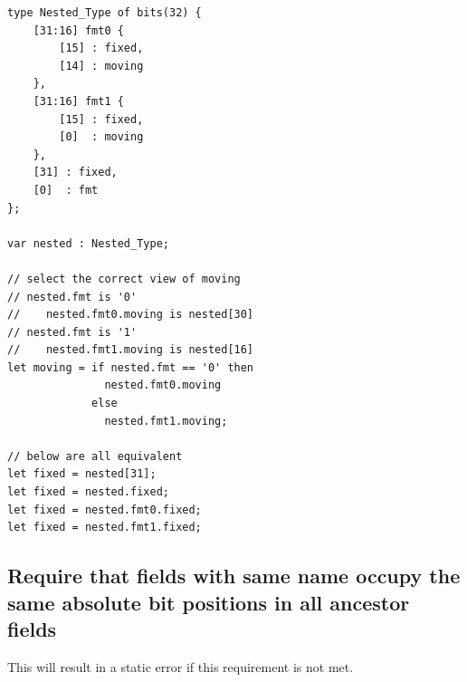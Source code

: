 \begin{verbatim}
type Nested_Type of bits(32) {
    [31:16] fmt0 {
        [15] : fixed,
        [14] : moving
    },
    [31:16] fmt1 {
        [15] : fixed,
        [0]  : moving
    },
    [31] : fixed,
    [0]  : fmt            
};

var nested : Nested_Type; 

// select the correct view of moving
// nested.fmt is '0'
//    nested.fmt0.moving is nested[30]
// nested.fmt is '1'
//    nested.fmt1.moving is nested[16]
let moving = if nested.fmt == '0' then 
               nested.fmt0.moving 
             else 
               nested.fmt1.moving; 

// below are all equivalent 
let fixed = nested[31]; 
let fixed = nested.fixed;
let fixed = nested.fmt0.fixed;
let fixed = nested.fmt1.fixed; 
\end{verbatim}

\subsection{Require that fields with same name occupy the same absolute bit
positions in all ancestor fields}

This will result in a static error if this requirement is not met.


